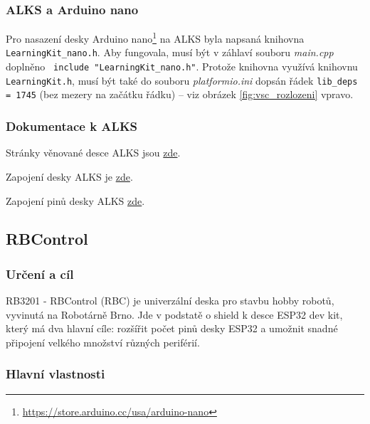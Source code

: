 \label{alks:nano} \subsubsection*{ALKS a Arduino nano}

Pro nasazení desky Arduino nano\footnote{\url{https://store.arduino.cc/usa/arduino-nano}} 
na ALKS byla  napsaná knihovna \newline
{\tt LearningKit\_nano.h}. 
Aby fungovala, musí být v záhlaví souboru {\it main.cpp} doplněno
\verb| include "LearningKit_nano.h"|. Protože knihovna  využívá 
knihovnu {\tt LearningKit.h}, musí být také do souboru {\it platformio.ini} dopsán řádek {\tt lib\_deps = 1745} (bez mezery na začátku řádku)  -- viz obrázek \ref{fig:vsc_rozlozeni} vpravo.



\subsubsection*{Dokumentace k ALKS}

Stránky  věnované desce ALKS jsou
 \href{https://github.com/RoboticsBrno/ArduinoLearningKitStarter}{zde}.

Zapojení desky ALKS je \href{https://github.com/RoboticsBrno/ArduinoLearningKitStarter/blob/master/docs/ArduinoLearningKitStarter.pdf}{zde}.

Zapojení pinů desky ALKS \href{https://github.com/RoboticsBrno/ArduinoLearningKitStarter/blob/master/docs/pinout.pdf}{zde}. 


\subsection{RBControl} 

\subsubsection*{Určení a cíl}

RB3201 - RBControl (RBC) je univerzální deska pro stavbu hobby robotů, vyvinutá na Robotárně Brno. 
Jde v podstatě o shield k desce ESP32 dev kit, který má dva hlavní cíle: 
rozšířit počet pinů desky ESP32 a umožnit snadné připojení velkého množství různých periférií.

\subsubsection*{Hlavní vlastnosti}

